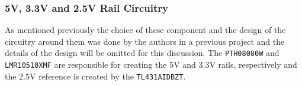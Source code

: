 \subsubsection{5V, 3.3V and 2.5V Rail Circuitry} %
\label{subsub:pth08080w}
As mentioned previously the choice of these component and the design of the circuitry around them was done by the authors in a previous project \cite{isaswarm} and the details of the design will be omitted for this discussion.
The \texttt{PTH08080W} and \texttt{LMR10510XMF} are responsible for creating the 5V and 3.3V rails, respectively and the 2.5V reference is created by the \texttt{TL431AIDBZT}.

